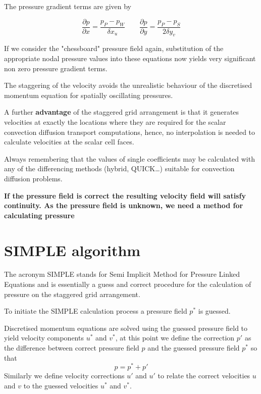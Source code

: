 \documentclass[a4paper, 15pt]{article}
\begin{document}
The pressure gradient terms are given by

\[\dfrac{\partial p}{\partial x} = \dfrac{p_P-p_W}{\delta x_u} \qquad \dfrac{\partial p}{\partial y} = \dfrac{p_P - p_S}{2\delta y_v}\]

If
we consider the "chessboard" pressure field again, substitution of the appropriate nodal
pressure values into these equations now yields very significant non zero pressure gradient
terms. \newline 

The
staggering of the velocity avoids the unrealistic behaviour of the discretised momentum
equation for spatially oscillating pressures. \newline 


A
further \textbf{advantage} of the staggered grid arrangement is that it generates velocities at exactly
the locations where they are required for the scalar convection diffusion transport
computations, hence,
no interpolation is needed to calculate velocities at the scalar cell faces.\newline 

Always remembering that the values of single coefficients may be calculated with any of the differencing methods
(hybrid, QUICK\dots) suitable for convection diffusion problems. \newline 

\textbf{If
	the pressure field is correct the resulting velocity field will satisfy continuity. As the pressure
	field is unknown, we need a method for calculating pressure}


\section{SIMPLE algorithm}

The
acronym SIMPLE stands for Semi Implicit Method for Pressure Linked Equations and is
essentially a guess and correct procedure for the calculation of pressure on the staggered grid
arrangement. \newline 

To
initiate the SIMPLE calculation process a pressure field $p^*$ is guessed. 

Discretised momentum
equations are solved using the guessed pressure field to yield velocity components $u^*$ and $v^*$, at this point
we define the correction $p'$ as the difference between correct pressure field $p$ and the
guessed pressure field $p^*$ so that
\[p = p^* + p'\]
Similarly
we define velocity corrections $u'$ and $u'$ to relate the correct velocities $u$ and $v$ to the
guessed velocities $u^*$ and $v^*$. \newline 
\end{document}
